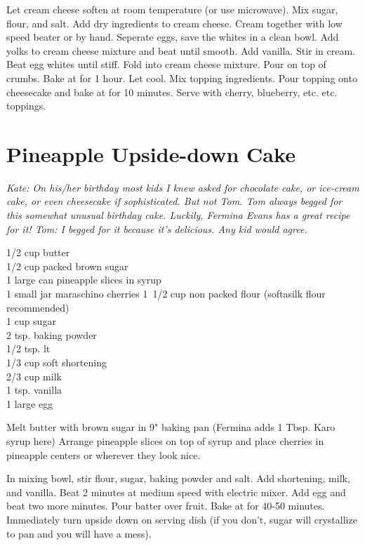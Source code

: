 Let cream cheese soften at room temperature (or use microwave).  Mix sugar,
flour, and salt.  Add dry ingredients to cream cheese.  Cream together with low
speed beater or by hand.  Seperate eggs, save the whites in a clean bowl.  Add
yolks to cream cheese mixture and beat until smooth.  Add vanilla.  Stir in
cream.  Beat egg whites until stiff.  Fold into cream cheese mixture.  Pour on
top of crumbs.  Bake at  for 1 hour.  Let cool.  Mix topping
ingredients.  Pour topping onto cheesecake and bake at  for 10
minutes.  Serve with cherry, blueberry, etc. etc. toppings.

\section{Pineapple Upside-down Cake}

\textit{Kate: On his/her birthday most kids I knew asked for chocolate cake, or
ice-cream cake,  or even cheesecake if  sophisticated. But not Tom.
Tom always begged for this somewhat unusual birthday cake. Luckily, Fermina
Evans has a great recipe for it!
Tom: I begged for it because it's delicious. Any kid would agree.}
\begin{ingredients}
1/2 cup butter \\
1/2 cup packed brown sugar \\
1 large can pineapple slices in syrup \\
1 small jar maraschino cherries
1\ 1/2 cup non packed flour (softasilk flour recommended) \\
1 cup sugar \\
2 tsp. baking powder \\
1/2 tsp. lt \\
1/3 cup soft shortening \\
2/3 cup milk \\
1 tsp. vanilla \\
1 large egg
\end{ingredients}
Melt butter with brown sugar in 9" baking pan (Fermina adds 1 Tbsp. Karo syrup
here) Arrange pineapple slices on top of syrup and place cherries in pineapple
centers or wherever they look nice. 

In mixing bowl, stir flour, sugar, baking powder and salt. Add shortening,
milk, and vanilla. Beat 2 minutes at medium speed with electric mixer. Add egg
and beat two more minutes. Pour batter over fruit. Bake at  for
40-50 minutes. Immediately turn upside
down on serving dish (if you don't, sugar will crystallize to pan and you will
have a mess). 

